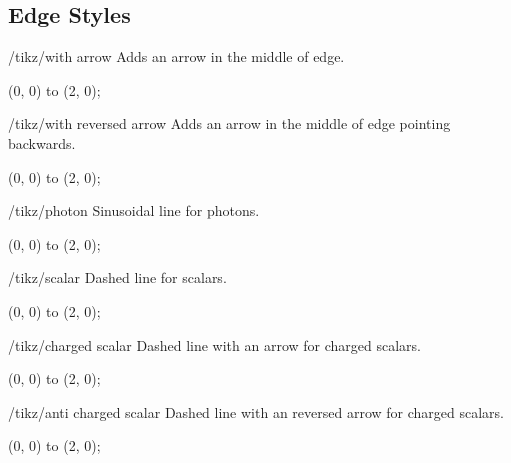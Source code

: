 \documentclass[a4paper,final]{ltxdoc}
\begin{document}
\subsection{Edge Styles}
\label{subsec:edge_styles}

\begin{key}{/tikz/with arrow}
  Adds an arrow in the middle of edge.

\begin{codeexample}[]
\tikz {} (0, 0) to (2, 0);
\end{codeexample}
\end{key}

\begin{key}{/tikz/with reversed arrow}
  Adds an arrow in the middle of edge pointing backwards.

\begin{codeexample}[]
\tikz {} (0, 0) to (2, 0);
\end{codeexample}
\end{key}

\begin{key}{/tikz/photon}
  Sinusoidal line for photons.

\begin{codeexample}[]
\tikz \draw[photon] (0, 0) to (2, 0);
\end{codeexample}
\end{key}

\begin{key}{/tikz/scalar}
  Dashed line for scalars.

\begin{codeexample}[]
\tikz \draw[scalar] (0, 0) to (2, 0);
\end{codeexample}
\end{key}

\begin{key}{/tikz/charged scalar}
  Dashed line with an arrow for charged scalars.

\begin{codeexample}[]
\tikz {} (0, 0) to (2, 0);
\end{codeexample}
\end{key}

\begin{key}{/tikz/anti charged scalar}
  Dashed line with an reversed arrow for charged scalars.

\begin{codeexample}[]
\tikz {} (0, 0) to (2, 0);
\end{codeexample}
\end{key}
\end{document}
